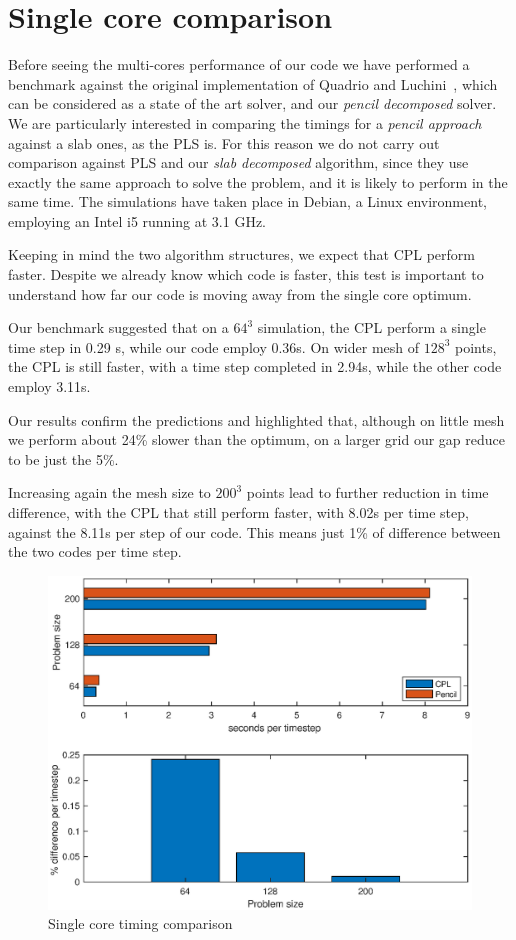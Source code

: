 \section{Single core comparison}
Before seeing the multi-cores performance of our code we have performed a benchmark against the original implementation of Quadrio and Luchini~\cite{cpl:presentazione}, which can be considered as a state of the art solver, and our \emph{pencil decomposed} solver. We are particularly  interested in comparing the timings for a \emph{pencil approach} against a slab ones, as the PLS is. For this reason we do not carry out comparison against PLS and our \emph{slab decomposed} algorithm, since they use exactly the same approach to solve the problem, and it is likely to perform in the same time.
The simulations have taken place in Debian, a Linux environment, employing an Intel i5 running at 3.1 GHz.\par
Keeping in mind the two algorithm structures, we expect that CPL perform faster. Despite we already know which code is faster, this test is important to understand how far our code is moving away from the single core optimum. \par
Our benchmark suggested that on a $64^{3}$ simulation, the CPL perform a single time step in 0.29 s, while our code employ 0.36s.
On wider mesh of $128^{3}$ points, the CPL  is still faster, with a time step completed in 2.94s, while the other code employ 3.11s.\par
Our results confirm the predictions and highlighted that, although on little mesh we perform about 24\% slower than the optimum, on a larger grid our gap reduce to be just the 5\%. \par
Increasing again the mesh size to $200^{3}$ points lead to further reduction in time difference, with the CPL that still perform faster, with 8.02s per time step, against the 8.11s per step of our code. This means just 1\% of difference between the two codes per time step.
\begin{figure}
\begin{center}
\includegraphics[scale=0.55]{grafici/single_core}
\caption{Single core timing comparison}
\label{single:core}
\end{center}
\end{figure}
